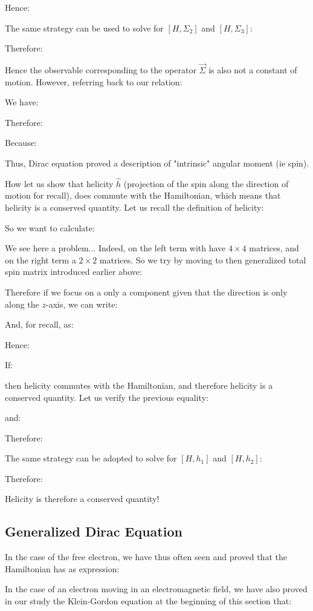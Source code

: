 	Hence:
	
	The same strategy can be used to solve for $[H,\Sigma_2]$ and $[H,\Sigma_3]$:
	
	Therefore:
	
	Hence the observable corresponding to the operator $\vec{\Sigma}$ is also not a constant of motion. However, referring back to our relation:
	
	We have:
	
	Therefore:
	
	Because:
	
	Thus, Dirac equation proved a description of "intrinsic" angular moment (ie spin).
	
	How let us show that helicity $\hat{h}$ (projection of the spin along the direction of motion for recall), does commute with the Hamiltonian, which means that helicity is a conserved quantity. Let us recall the definition of helicity:
	
	So we want to calculate:
	
	We see here a problem... Indeed, on the left term with have $4\times 4$ matrices, and on the right term a $2\times 2$ matrices. So we try by moving to then generalized total spin matrix introduced earlier above:
	
	Therefore if we focus on a only a component given that the direction is only along the $z$-axis, we can write:
	
	And, for recall, as:
	
	Hence:
	
	If:
	
	then helicity commutes with the Hamiltonian, and therefore helicity is a conserved quantity. Let us verify the previous equality:
	
	and:
	
	Therefore:
	
	The same strategy can be adopted to solve for $[H,h_1]$ and $[H,h_2]$:
	
	Therefore:
	
	Helicity is therefore a conserved quantity!
	
	\pagebreak
	\subsection{Generalized Dirac Equation}
	In the case of the free electron, we have thus often seen and proved that the Hamiltonian has as expression:
	
	In the case of an electron moving in an electromagnetic field, we have also proved in our study the Klein-Gordon equation at the beginning of this section that:
	
